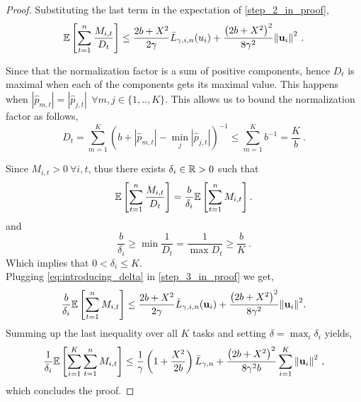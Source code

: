 {\begin{proof}
Substituting the last term in the expectation of
\eqref{step_2_in_proof}, %
\begin{equation}
\mathbb{E}\left[ \sum_{t=1}^{n}{\frac{M_{i,t}}{D_{t}}} \right]
\le \frac{2b+X^2}{2\gamma}{\bar
  L}_{\gamma,i,n}(u_i)+\frac{\left({2b+X^2}\right)^2}{8{\gamma}^2}{\left\Vert
    \mathbf{u}_{i} \right\Vert}^2~.
\label{step_3_in_proof}
\end{equation} 

Since that the normalization factor is a sum of positive components,
hence $D_t$ is maximal when each of the components gets its maximal
value. This happens when $\left\vert \hat{p}_{m,t}
\right\vert=\left\vert \hat{p}_{j,t} \right\vert ~~  \forall
m,j \in\{1,..,K\}$. This allows us to bound the normalization factor as
follows,
\begin{equation}
D_{t}=\sum_{m=1}^{K}{\left({b+\left\vert \hat{p}_{m,t}
      \right\vert-\min_{j}{\left\vert \hat{p}_{j,t}
        \right\vert}}\right)^{-1}} \le \sum_{m=1}^{K}{b^{-1}}=\frac{K}{b}~.
\label{bound_D}
\end{equation}


Since $M_{i,t}>0 ~\forall{i,t}$, thus there exists $\delta_i\in\mathbb{R}>0$ such that 
\begin{equation}
\label{eq:introducing_delta}
\mathbb{E}\left[{\sum_{t=1}^{n}{\frac{M_{i,t}}{D_{t}}}}\right] = 
\frac{b}{\delta_i}\mathbb{E}\left[{\sum_{t=1}^{n}{M_{i,t}}}\right].
\end{equation}
and
\[
\frac{b}{\delta_i} \geq \min\frac{1}{D_t}  = \frac{1}{\max D_t}  \geq 
\frac{b}{K}~.
\]
Which implies that $0<\delta_i\le K$.\\
Plugging \eqref{eq:introducing_delta} in \eqref{step_3_in_proof} we get,
\begin{equation}\label{eq:bound_for_i}
\frac{b}{\delta_i}\mathbb{E}\left[ \sum_{t=1}^{n}{M_{i,t}} \right]
\le \frac{2b+X^2}{2\gamma}{\bar L}_{\gamma,i,n}(\mathbf{u}_{i})+\frac{\left({2b+X^2}\right)^2}{8{\gamma}^2}{\left\Vert \mathbf{u}_{i} \right\Vert}^2.
\end{equation}
Summing up the last inequality over all $K$ tasks and setting $\delta
= \max_i \delta_i$ yields, 
\begin{equation}
\begin{split}
\frac{1}{\delta_i}\mathbb{E}\left[ \sum_{i=1}^{K}\sum_{t=1}^{n}{M_{i,t}} \right]
\le\frac{1}{\gamma}\left(1+\frac{X^2}{2b} \right){\bar L}_{\gamma,n}+
\frac{\left({2b+X^2}\right)^2}{8{\gamma}^2b}\sum_{i=1}^{K}{{\left\Vert \mathbf{u}_{i} 
\right\Vert}^2}~,
\end{split}
\label{final_eq}
\end{equation}
which concludes the proof.
\QED
\end{proof}

}
